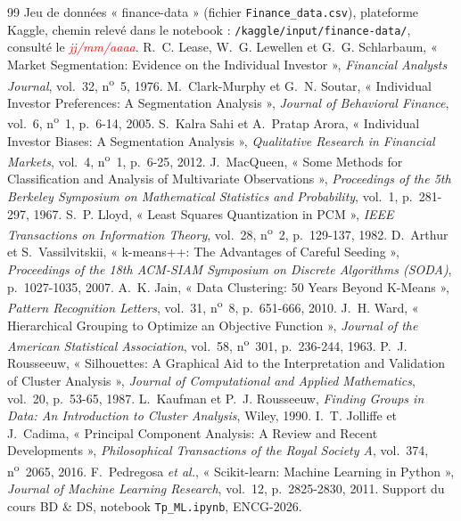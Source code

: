 \documentclass[11pt,a4paper]{article}
\newcounter{nbacompleter}
\DeclareRobustCommand{\acel}[1]{%
  \stepcounter{nbacompleter}\textcolor{red}{\textit{#1}}}
\begin{document}
\begin{thebibliography}{99}
   Jeu de données « finance-data » (fichier \texttt{Finance\_data.csv}), plateforme Kaggle, chemin relevé dans le notebook : \texttt{/kaggle/input/finance-data/}, consulté le \acel{jj/mm/aaaa}.
   R.~C. Lease, W.~G. Lewellen et G.~G. Schlarbaum, « Market Segmentation: Evidence on the Individual Investor », \textit{Financial Analysts Journal}, vol.~32, n\textsuperscript{o}~5, 1976.
   M.~Clark-Murphy et G.~N. Soutar, « Individual Investor Preferences: A Segmentation Analysis », \textit{Journal of Behavioral Finance}, vol.~6, n\textsuperscript{o}~1, p.~6-14, 2005.
   S.~Kalra Sahi et A.~Pratap Arora, « Individual Investor Biases: A Segmentation Analysis », \textit{Qualitative Research in Financial Markets}, vol.~4, n\textsuperscript{o}~1, p.~6-25, 2012.
   J.~MacQueen, « Some Methods for Classification and Analysis of Multivariate Observations », \textit{Proceedings of the 5th Berkeley Symposium on Mathematical Statistics and Probability}, vol.~1, p.~281-297, 1967.
   S.~P. Lloyd, « Least Squares Quantization in PCM », \textit{IEEE Transactions on Information Theory}, vol.~28, n\textsuperscript{o}~2, p.~129-137, 1982.
   D.~Arthur et S.~Vassilvitskii, « k-means++: The Advantages of Careful Seeding », \textit{Proceedings of the 18th ACM-SIAM Symposium on Discrete Algorithms (SODA)}, p.~1027-1035, 2007.
   A.~K. Jain, « Data Clustering: 50 Years Beyond K-Means », \textit{Pattern Recognition Letters}, vol.~31, n\textsuperscript{o}~8, p.~651-666, 2010.
   J.~H. Ward, « Hierarchical Grouping to Optimize an Objective Function », \textit{Journal of the American Statistical Association}, vol.~58, n\textsuperscript{o}~301, p.~236-244, 1963.
   P.~J. Rousseeuw, « Silhouettes: A Graphical Aid to the Interpretation and Validation of Cluster Analysis », \textit{Journal of Computational and Applied Mathematics}, vol.~20, p.~53-65, 1987.
   L.~Kaufman et P.~J. Rousseeuw, \textit{Finding Groups in Data: An Introduction to Cluster Analysis}, Wiley, 1990.
   I.~T. Jolliffe et J.~Cadima, « Principal Component Analysis: A Review and Recent Developments », \textit{Philosophical Transactions of the Royal Society A}, vol.~374, n\textsuperscript{o}~2065, 2016.
   F.~Pedregosa \textit{et al.}, « Scikit-learn: Machine Learning in Python », \textit{Journal of Machine Learning Research}, vol.~12, p.~2825-2830, 2011.
   Support du cours BD \& DS, notebook \texttt{Tp\_ML.ipynb}, ENCG-2026.
\end{thebibliography}
\end{document}
